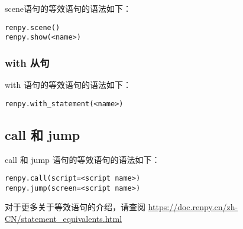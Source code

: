 scene语句的等效语句的语法如下：

\begin{lstlisting}
renpy.scene()
renpy.show(<name>)
\end{lstlisting}

\subsubsection{with 从句}

with 语句的等效语句的语法如下：

\begin{lstlisting}
renpy.with_statement(<name>)
\end{lstlisting}

\subsection{call 和 jump}

call 和 jump 语句的等效语句的语法如下：

\begin{lstlisting}
renpy.call(script=<script name>)
renpy.jump(screen=<script name>)
\end{lstlisting}

对于更多关于等效语句的介绍，请查阅 \url{https://doc.renpy.cn/zh-CN/statement_equivalents.html}